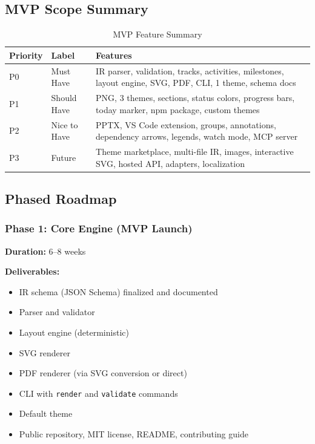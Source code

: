 \subsection{MVP Scope Summary}

\begin{table}[h]
\centering
\caption{MVP Feature Summary}
\begin{tabularx}{\textwidth}{llX}
\toprule
\textbf{Priority} & \textbf{Label} & \textbf{Features} \\
\midrule
P0 & Must Have & IR parser, validation, tracks, activities, milestones, layout engine, SVG, PDF, CLI, 1 theme, schema docs \\
P1 & Should Have & PNG, 3 themes, sections, status colors, progress bars, today marker, npm package, custom themes \\
P2 & Nice to Have & PPTX, VS Code extension, groups, annotations, dependency arrows, legends, watch mode, MCP server \\
P3 & Future & Theme marketplace, multi-file IR, images, interactive SVG, hosted API, adapters, localization \\
\bottomrule
\end{tabularx}
\end{table}

\subsection{Phased Roadmap}

\subsubsection{Phase 1: Core Engine (MVP Launch)}

\textbf{Duration:} 6–8 weeks

\textbf{Deliverables:}
\begin{itemize}
  \item IR schema (JSON Schema) finalized and documented
  \item Parser and validator
  \item Layout engine (deterministic)
  \item SVG renderer
  \item PDF renderer (via SVG conversion or direct)
  \item CLI with \texttt{render} and \texttt{validate} commands
  \item Default theme
  \item Public repository, MIT license, README, contributing guide
\end{itemize}

